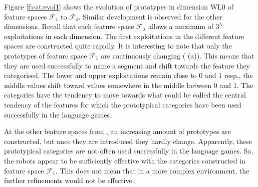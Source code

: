 Figure \ref{f:cat:evol1} shows the evolution of prototypes in dimension WL0 of feature spaces ${\mathcal F}_1$ to ${\mathcal F}_4$. Similar development is observed for the other dimensions. Recall that each feature space ${\mathcal F}_\lambda$ allows a maximum of $3^\lambda$ exploitations in each dimension. The first exploitations in the different feature spaces are constructed quite rapidly. It is interesting to note that only the prototypes of feature space ${\mathcal F}_1$  are continuously changing ( (a)). This means that they are used successfully to name a segment and shift towards the feature they categorised. The lower and upper exploitations remain close to 0 and 1 resp., the middle values shift toward values somewhere in the middle between 0 and 1. The categories have the tendency to move towards what could be called the central tendency of the features for which the prototypical categories have been used successfully in the language games. 

At the other feature spaces from , an increasing amount of prototypes are constructed, but once they are introduced they hardly change. Apparently, these prototypical categories are not often used successfully in the language games. So, the robots appear to be sufficiently effective with the categories constructed in feature space ${\mathcal F}_1$. This does not mean that in a more complex environment, the further refinements would not be effective.

